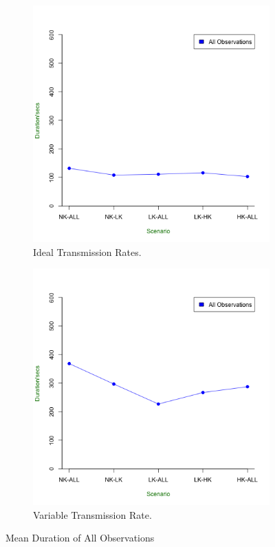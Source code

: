 \begin{figure}[h]
\centering 
\begin{subfigure}{.5\textwidth}
  \includegraphics[width=\textwidth]{Chap7/figures/ideal_all_dur}
	\caption{Ideal Transmission Rates.}
	\label{fig:res:ideal:dur}
\end{subfigure}
\begin{subfigure}{.5\textwidth}
  \includegraphics[width=\textwidth]{Chap7/figures/real_all_dur}
	\caption{Variable Transmission Rate.}
	\label{fig:real:dur}
\end{subfigure}
\caption{Mean Duration of All Observations}
\label{fig:mean:dur}
\end{figure}

